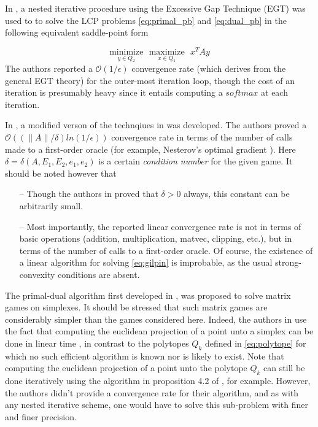 \documentclass[12pt]{article}
\begin{document}
In \cite{hoda2010smoothing}, a nested iterative procedure using the Excessive Gap Technique (EGT) \cite{nesterov2005excessive} was used to to solve the LCP problems \eqref{eq:primal_pb} and \eqref{eq:dual_pb} in the following equivalent saddle-point form

\begin{equation}
  \underset{y \in Q_2}{\text{minimize}}\text{ }\underset{x \in Q_1}{\text{maximize}}\text{ }x^TAy
  \label{eq:gilpin}
\end{equation}
The authors reported a $\mathcal{O}(1/\epsilon)$ convergence rate (which derives from the general EGT theory) for the outer-most iteration loop, though the cost of an iteration is presumably heavy since it entails computing a $softmax$ at each iteration.

In \cite{gilpinfirst}, a modified verson of the technqiues in \cite{hoda2010smoothing} was developed. The authors proved a $\mathcal{O}\left(\left(\|A\| / \delta\right) ln\left(1 / \epsilon\right)\right)$ convergence rate in terms of the number of calls made to a first-order oracle (for example, Nesterov's optimal gradient \cite{nesterov1983}). Here $\delta = \delta(A, E_1, E_2, e_1, e_2)$ is a certain \textit{condition number} for the given game.
It should be noted however that
\begin{itemize}
\item[--] Though the authors in \cite{gilpinfirst} proved that $\delta > 0$ always, this constant can be arbitrarily small.
\item[--] Most importantly, the reported linear convergence rate is not in terms of basic operations (addition, multiplication, matvec, clipping, etc.), but in terms of the number of calls to a first-order oracle. Of course, the existence of a linear algorithm for solving \eqref{eq:gilpin} is improbable, as the usual strong-convexity conditions are absent.
\end{itemize}


The primal-dual algorithm first developed in \cite{chambolle2010}, was proposed \cite{chambolle2014ergodic} to solve matrix games on simplexes. It should be stressed that such matrix games are considerably simpler than the games considered here. Indeed, the authors in \cite{chambolle2014ergodic} use the fact that computing the euclidean projection of a point unto a simplex can be done in linear time \cite{duchi2008efficient}, in contrast to the polytopes $Q_k$ defined in \eqref{eq:polytope} for which no such efficient algorithm is known nor is likely to exist. Note that computing the euclidean projection of a point unto the polytope $Q_k$ can still be done iteratively using the algorithm in proposition 4.2 of \cite{combettes2010dualization}, for example. However, the authors didn't provide a convergence rate for their algorithm, and as with any nested iterative scheme, one would have to solve this sub-problem with finer and finer precision.
\end{document}
